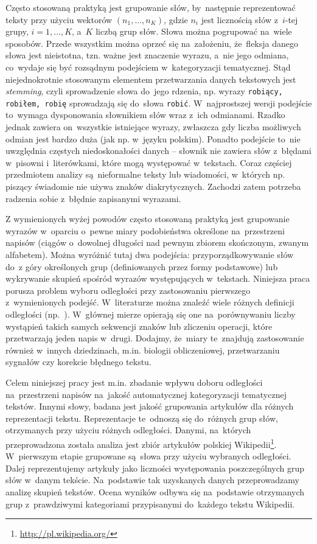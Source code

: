 \documentclass{praca1}
\begin{document}
Często stosowaną praktyką jest grupowanie słów, by~następnie reprezentować teksty przy użyciu wektorów $(n_1,\ldots, n_K)$, gdzie $n_i$ jest licznością słów z~$i$-tej grupy, $i = 1,\ldots,K$, a~$K$ liczbą grup słów. Słowa można pogrupować na~wiele sposobów. Przede wszystkim można oprzeć się na~założeniu, że~fleksja danego słowa jest nieistotna, tzn. ważne jest znaczenie wyrazu, a~nie jego odmiana, co~wydaje się być rozsądnym podejściem w~kategoryzacji tematycznej. Stąd niejednokrotnie stosowanym elementem przetwarzania danych tekstowych jest \emph{stemming}, czyli sprowadzenie słowa do~jego rdzenia, np. wyrazy \verb|robiący, robiłem, robię| sprowadzają się do~słowa \verb|robić|. W~najprostszej wersji podejście to~wymaga dysponowania słownikiem słów wraz z~ich odmianami. Rzadko jednak zawiera on~wszystkie istniejące wyrazy, zwłaszcza gdy liczba możliwych odmian jest bardzo duża (jak np. w~języku polskim). Ponadto podejście to~nie uwzględnia częstych niedoskonałości danych -- słownik nie zawiera słów z~błędami w~pisowni i~literówkami, które mogą występować w~tekstach. Coraz częściej przedmiotem analizy są~nieformalne teksty lub wiadomości, w~których np. piszący świadomie nie używa znaków diakrytycznych. Zachodzi zatem potrzeba radzenia sobie z~błędnie zapisanymi wyrazami. 

Z wymienionych wyżej powodów często stosowaną praktyką jest grupowanie wyrazów w~oparciu o~pewne miary podobieństwa określone na~przestrzeni napisów (ciągów o~dowolnej długości nad pewnym zbiorem skończonym, zwanym alfabetem). Można wyróżnić tutaj dwa podejścia: przyporządkowywanie słów do~z góry określonych grup (definiowanych przez formy podstawowe) lub wykrywanie skupień spośród wyrazów występujących w~tekstach. Niniejsza praca porusza problem wyboru odległości przy zastosowaniu pierwszego z~wymienionych podejść. W~literaturze można znaleźć wiele różnych definicji odległości (np.~\cite{Levenshtein1965:binarycodes, Boytsov2011:indexingmethods, Navarro2001:guidedtour}). W~głównej mierze opierają się one na~porównywaniu liczby wystąpień takich samych sekwencji znaków lub zliczeniu operacji, które przetwarzają jeden napis w~drugi. Dodajmy, że~miary te~znajdują zastosowanie również w~innych dziedzinach, m.in. biologii obliczeniowej, przetwarzaniu sygnałów czy korekcie błędnego tekstu.


Celem niniejszej pracy jest m.in. zbadanie wpływu doboru odległości na~przestrzeni napisów na~jakość automatycznej kategoryzacji tematycznej tekstów. Innymi słowy, badana jest jakość grupowania artykułów dla różnych reprezentacji tekstu. Reprezentacje te~odnoszą się do~różnych grup słów, otrzymanych przy użyciu różnych odległości. Danymi, na~których przeprowadzona została analiza jest zbiór artykułów polskiej Wikipedii\footnote{\url{http://pl.wikipedia.org/}}. W~pierwszym etapie grupowane są~słowa przy użyciu wybranych odległości. Dalej reprezentujemy artykuły jako liczności występowania poszczególnych grup słów w~danym tekście. Na~podstawie tak uzyskanych danych przeprowadzamy analizę skupień tekstów. Ocena wyników odbywa się na~podstawie otrzymanych grup z~prawdziwymi kategoriami przypisanymi do~każdego tekstu Wikipedii.
\end{document}
